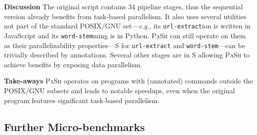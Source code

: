 \documentclass[sigplan, review, screen, anonymous]{acmart}
\newcommand{\eg}{{\em e.g.}, }
\newcommand{\heading}[1]{\vspace{4pt}\noindent\textbf{#1}\enspace}
\newcommand{\ttt}[1]{\texttt{#1}}
\newcommand{\cn}[1]{\mbox{\textcircled{\footnotesize #1}}}
\newcommand{\sta}{\cn{\textsc{S}}\xspace}
\newcommand{\pur}{\cn{\textsc{P}}\xspace}
\newcommand{\dfs}{\cn{\textsc{F}}\xspace}
\newcommand{\kk}[1]{[{\color{magenta}kk: #1}]}
\newcommand{\sys}{{\scshape PaSh}\xspace}
\begin{document}

\heading{Discussion}
The original script contains 34 pipeline stages, thus the sequential version already benefits from task-based parallelism.
It also uses several utilities not part of the standard POSIX/GNU set---\eg its \ttt{url-extract}ion is written in JavaScript and its \ttt{word-stem}ming is in Python.
\sys can still operate on them as their parallelizability properties---\sta for \ttt{url-extract} and \ttt{word-stem}---can be trivially described by annotations.
Several other stages are in \sta allowing \sys to achieve benefits by exposing data parallelism.

\heading{Take-aways}
\sys operates on programs with (annotated) commands outside the POSIX/GNU subsets and leads to notable speedups, even when the original program features significant task-based parallelism.

% 
% 
% 
% 

\subsection{Further Micro-benchmarks}
\label{micro}

\end{document}
